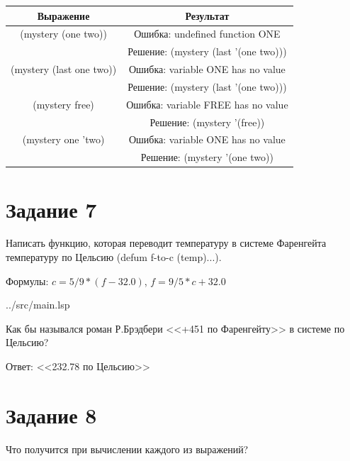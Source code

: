\begin{table}[ht]
	\begin{center}
		\begin{tabular}{|c|c|}
			\hline
			\textbf{Выражение} & \textbf{Результат} \\
			\hline
			(mystery (one two)) & Ошибка: undefined function ONE \\
			& Решение: (mystery (last '(one two))) \\
			\hline
			 (mystery (last one two)) & Ошибка: variable ONE has no value \\
			 & Решение: (mystery (last '(one two))) \\
			\hline
			(mystery free) &  Ошибка: variable FREE has no value \\
			& Решение: (mystery '(free)) \\
			\hline
			(mystery one 'two) & Ошибка: variable ONE has no value \\
			& Решение: (mystery '(one two)) \\
			\hline
		\end{tabular}
	\end{center}
\end{table}

\section*{Задание 7}
Написать функцию, которая переводит температуру в системе Фаренгейта температуру по Цельсию (defum f-to-c (temp)...).

Формулы:  $c = 5 / 9 * (f - 32.0)$, $f = 9 / 5 * c + 32.0$

\begin{lstinputlisting}[
	caption={Задание 7},
	label={lst:t2},
	linerange={70-72},
	]{../src/main.lsp}
\end{lstinputlisting}

Как бы назывался роман Р.Брэдбери <<+451 по Фаренгейту>> в системе по Цельсию?

Ответ: <<232.78 по Цельсию>>

\clearpage

\section*{Задание 8}
Что получится при вычислении каждого из выражений?

